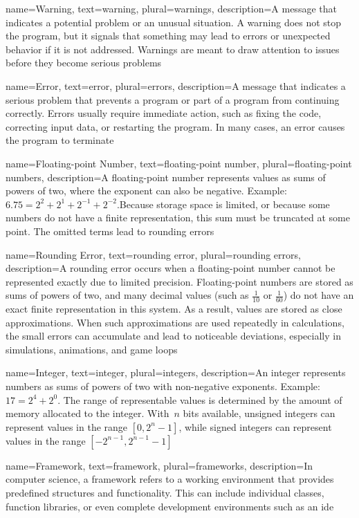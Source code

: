 {
	name={Warning},
	text={warning},
	plural={warnings},
	description={A message that indicates a potential problem or an unusual situation. A warning does not stop the program, but it signals that something may lead to errors or unexpected behavior if it is not addressed. Warnings are meant to draw attention to issues before they become serious problems}
}

{
	name={Error},
	text={error},
	plural={errors},
	description={A message that indicates a serious problem that prevents a program or part of a program from continuing correctly. Errors usually require immediate action, such as fixing the code, correcting input data, or restarting the program. In many cases, an error causes the program to terminate}
}

{
	name={Floating-point Number},
	text={floating-point number},
	plural={floating-point numbers},
	description={A floating-point number represents values as sums of powers of two, where the exponent can also be negative. Example: $6.75 = 2^2 + 2^1 + 2^{-1} + 2^{-2}$.Because storage space is limited, or because some numbers do not have a finite representation, this sum must be truncated at some point. The omitted terms lead to rounding errors}
}

{
	name={Rounding Error},
	text={rounding error},
	plural={rounding errors},
	description={A rounding error occurs when a floating-point number cannot be represented exactly due to limited precision. Floating-point numbers are stored as sums of powers of two, and many decimal values (such as $\tfrac{1}{10}$ or $\tfrac{1}{60}$) do not have an exact finite representation in this system. As a result, values are stored as close approximations. When such approximations are used repeatedly in calculations, the small errors can accumulate and lead to noticeable deviations, especially in simulations, animations, and game loops}
}


{
	name={Integer},
	text={integer},
	plural={integers},
	description={An integer represents numbers as sums of powers of two	with non-negative exponents. Example: $17 = 2^4 + 2^0$. The range of representable values is determined by the amount of	memory allocated to the integer. With~$n$ bits available, unsigned integers can represent values in the range $[0, 2^n - 1]$, while signed integers can represent values	in the range $[-2^{n-1}, 2^{n-1} - 1]$}
}

{
	name={Framework},
	text={framework},
	plural={frameworks},
	description={In computer science, a framework refers to a working environment that provides predefined structures and functionality. This can include individual classes, function libraries, or even complete development environments such as an \Gls{ide}}
}

